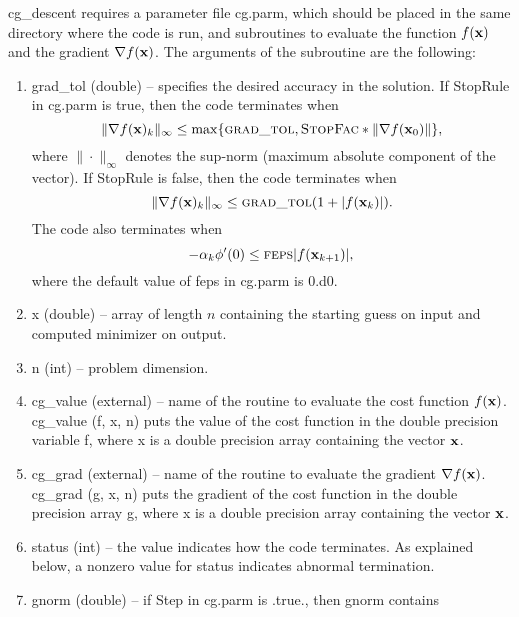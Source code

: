 \documentclass [12pt] {article}
\newcommand{\m}[1]{{\bf{#1}}}
\begin{document}
{\sc cg\_descent}
requires a parameter file {\sc cg.parm}, which should be placed
in the same directory where the code is run, and subroutines to evaluate
the function $f (\m{x})$ and the gradient $\nabla f (\m{x})$.
The arguments of the subroutine are the following:
\begin{enumerate}
\item
{\sc grad\_tol} (double) -- specifies the desired accuracy in the solution.
If {\sc StopRule}
in {\sc cg.parm} is true, then the code terminates when
%
\begin{equation}\label{stop1}
\|\nabla f (\m{x})_k\|_{\infty} \le
\max \{
\mbox{\sc grad\_tol}, \mbox{\sc StopFac} * \|\nabla f (\m{x}_0)\| \} ,
\end{equation}
%
where $\| \cdot\|_{\infty}$
denotes the sup-norm (maximum absolute component of the vector).
If {\sc StopRule} is false, then the code terminates when
%
\begin{equation}\label{stop2}
\|\nabla f (\m{x})_k\|_{\infty} \le \mbox{\sc grad\_tol}(1 + |f(\m{x}_k)|).
\end{equation}
%
The code also terminates when
%
\begin{equation}\label{stop3}
-\alpha_k \phi ' (0) \le \mbox{\sc feps}|f(\m{x}_{k+1})|,
\end{equation}
%
where the default value of {\sc feps} in {\sc cg.parm} is 0.d0.
\item
{\sc x} (double) -- array of length $n$ containing the starting guess
on input and computed minimizer on output.
\item
{\sc n} (int) -- problem dimension.
\item
{\sc cg\_value} (external) -- name of the routine to evaluate the
cost function $f(\m{x})$.
{\sc cg\_value (f, x, n)} puts the value of the cost function in
the double precision variable {\sc f},
where {\sc x} is a double precision array containing the vector $\m{x}$.
\item
{\sc cg\_grad} (external) -- name of the routine to evaluate the
gradient $\nabla f (\m{x})$.
{\sc cg\_grad (g, x, n)} puts the gradient of the cost function in
the double precision array {\sc g}, where {\sc x} is a double precision array
containing the vector $\m{x}$.
\item
{\sc status} (int) -- the value indicates how the code terminates.
As explained below,
a nonzero value for status indicates abnormal termination.
\item
{\sc gnorm} (double) --
if {\sc Step} in {\sc cg.parm} is .true., then {\sc gnorm} contains

\end{enumerate}
\end{document}
